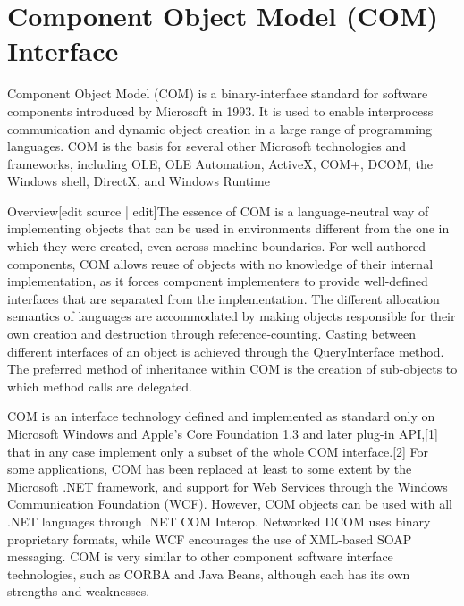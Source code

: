 %
%
%
%
%
%
%



\chapter{Component Object Model (COM) Interface}
\label{COMInterface}

Component Object Model (COM) is a binary-interface standard for software components introduced by Microsoft in 1993. It is used to enable interprocess communication and dynamic object creation in a large range of programming languages. COM is the basis for several other Microsoft technologies and frameworks, including OLE, OLE Automation, ActiveX, COM+, DCOM, the Windows shell, DirectX, and Windows Runtime

\vpara
Overview[edit source | edit]The essence of COM is a language-neutral way of implementing objects that can be used in environments different from the one in which they were created, even across machine boundaries. For well-authored components, COM allows reuse of objects with no knowledge of their internal implementation, as it forces component implementers to provide well-defined interfaces that are separated from the implementation. The different allocation semantics of languages are accommodated by making objects responsible for their own creation and destruction through reference-counting. Casting between different interfaces of an object is achieved through the QueryInterface method. The preferred method of inheritance within COM is the creation of sub-objects to which method calls are delegated.

\vpara
COM is an interface technology defined and implemented as standard only on Microsoft Windows and Apple's Core Foundation 1.3 and later plug-in API,[1] that in any case implement only a subset of the whole COM interface.[2] For some applications, COM has been replaced at least to some extent by the Microsoft .NET framework, and support for Web Services through the Windows Communication Foundation (WCF). However, COM objects can be used with all .NET languages through .NET COM Interop. Networked DCOM uses binary proprietary formats, while WCF encourages the use of XML-based SOAP messaging. COM is very similar to other component software interface technologies, such as CORBA and Java Beans, although each has its own strengths and weaknesses.

